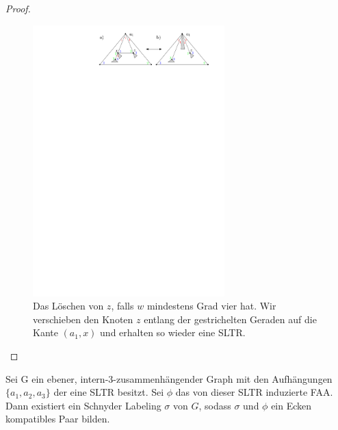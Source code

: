 \begin{proof}
\begin{description}[leftmargin =0pt, font = \bfseries]
\begin{figure}[h]
	\centering
	  \includegraphics[width=0.66\textwidth]{lem5_7.pdf}
    	\caption{Das Löschen von $z$, falls $w$ mindestens Grad vier hat. Wir verschieben den Knoten $z$ entlang der gestrichelten Geraden auf die Kante $(a_1,x)$ und erhalten so wieder eine SLTR.}
    	\label{pic_lem5_7}
\end{figure}

\end{description}

\end{proof}

\begin{lemma}\label{lem6}
Sei G ein ebener, intern-3-zusammenhängender Graph mit den Aufhängungen $\{a_1,a_2,a_3\}$ der eine SLTR besitzt. Sei $\phi$ das von dieser SLTR induzierte FAA. Dann existiert ein Schnyder Labeling $\sigma$ von $G$, sodass $\sigma$ und $\phi$ ein Ecken kompatibles Paar bilden.
\end{lemma}

